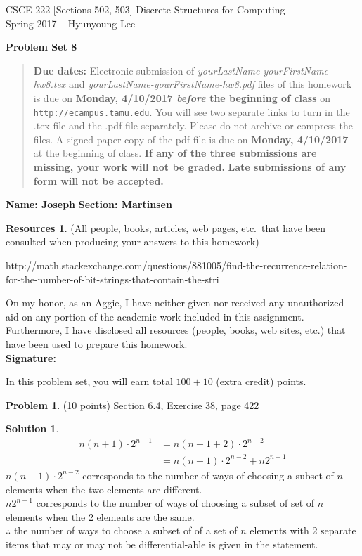 \documentclass{article}
\theoremstyle{definition}
\newtheorem{problem}{Problem}
\newtheorem*{solution}{Solution}
\newtheorem*{resources}{Resources}
\newcommand{\name}[2]{\noindent\textbf{Name: #1}\hfill \textbf{Section: #2}}
\newcommand{\honor}{\noindent On my honor, as an Aggie, I have neither
  given nor received any unauthorized aid on any portion of the
  academic work included in this assignment. Furthermore, I have
  disclosed all resources (people, books, web sites, etc.) that have
  been used to prepare this homework. \\[2ex]
 \textbf{Signature:} \underline{\hspace*{8cm}} }
\newcommand{\problemset}[1]{\begin{center}\textbf{Problem Set #1}\end{center}}
\newcommand{\duedate}[2]{\begin{quote}\textbf{Due dates:} Electronic
    submission of \textsl{yourLastName-yourFirstName-hw8.tex} and 
    \textsl{yourLastName-yourFirstName-hw8.pdf} files of this homework is due on
    \textbf{#1} on \texttt{http://ecampus.tamu.edu}. You will see two separate links
    to turn in the .tex file and the .pdf file separately. Please do not archive or compress the files.  
    A signed paper copy of the pdf file is due on \textbf{#2} at the beginning of class.
    \textbf{If any of the three submissions are missing, your work will not be graded.}
    \textbf{Late submissions of any form will not be accepted.}\end{quote} }
\begin{document}
\vspace*{-18mm}
\begin{center}
{\large
CSCE 222 [Sections 502, 503] Discrete Structures for Computing\\[.5ex]
Spring 2017 -- Hyunyoung Lee\\}
\end{center}
\problemset{8}
\duedate{Monday, 4/10/2017 \textit{before} the beginning of class}{Monday, 4/10/2017}
\name{ Joseph }{Martinsen}
\begin{resources} (All people, books, articles, web pages, etc.\ that
  have been consulted when producing your answers to this homework)
  
  http://math.stackexchange.com/questions/881005/find-the-recurrence-relation-for-the-number-of-bit-strings-that-contain-the-stri
\end{resources}
\honor

\bigskip

\noindent
In this problem set, you will earn total $100+10$ (extra credit) points.

\begin{problem} (10 points)
Section 6.4, Exercise 38, page 422
\end{problem}
\begin{solution} \ \\
\begin{align*}
  n(n+1) \cdot 2^{n-1} &= n(n-1+2) \cdot 2^{n-2} \\
  &= n(n-1) \cdot 2^{n-2} + n2^{n-1}
\end{align*}
$n(n-1)\cdot 2^{n-2}$ corresponds to the number of ways of choosing a subset of $n$ elements when the two elements are different. \\
$n2^{n-1}$ corresponds to the number of ways of choosing a subset of set of $n$ elements when the 2 elements are the same. \\
$\therefore$ the number of ways to choose a subset of of a set of $n$ elements with 2 separate items that may or may not be differential-able is given in the statement. 
\end{solution}
\end{document}
